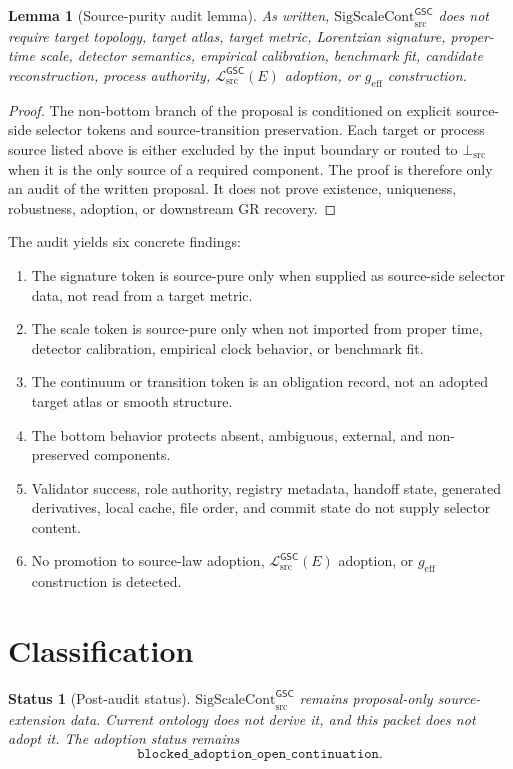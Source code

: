 \documentclass[11pt]{article}
\newcommand{\MetricData}{\mathcal{L}_{\mathrm{src}}^{\mathsf{GSC}}}
\newcommand{\geff}{g_{\mathrm{eff}}}
\newcommand{\SigScaleCont}{\mathrm{SigScaleCont}_{\mathrm{src}}^{\mathsf{GSC}}}
\newcommand{\BottomSrc}{\bot_{\mathrm{src}}}
\newtheorem{lemma}{Lemma}
\newtheorem{status}{Status}
\begin{document}
\begin{lemma}[Source-purity audit lemma]
As written, \(\SigScaleCont\) does not require target topology, target atlas,
target metric, Lorentzian signature, proper-time scale, detector semantics,
empirical calibration, benchmark fit, candidate reconstruction, process
authority, \(\MetricData(E)\) adoption, or \(\geff\) construction.
\end{lemma}

\begin{proof}
The non-bottom branch of the proposal is conditioned on explicit source-side
selector tokens and source-transition preservation. Each target or process
source listed above is either excluded by the input boundary or routed to
\(\BottomSrc\) when it is the only source of a required component. The proof is
therefore only an audit of the written proposal. It does not prove existence,
uniqueness, robustness, adoption, or downstream GR recovery.
\end{proof}

The audit yields six concrete findings:
\begin{enumerate}[leftmargin=*]
  \item The signature token is source-pure only when supplied as source-side
  selector data, not read from a target metric.
  \item The scale token is source-pure only when not imported from proper
  time, detector calibration, empirical clock behavior, or benchmark fit.
  \item The continuum or transition token is an obligation record, not an
  adopted target atlas or smooth structure.
  \item The bottom behavior protects absent, ambiguous, external, and
  non-preserved components.
  \item Validator success, role authority, registry metadata, handoff state,
  generated derivatives, local cache, file order, and commit state do not
  supply selector content.
  \item No promotion to source-law adoption, \(\MetricData(E)\) adoption, or
  \(\geff\) construction is detected.
\end{enumerate}

\section{Classification}

\begin{status}[Post-audit status]
\(\SigScaleCont\) remains proposal-only source-extension data. Current
ontology does not derive it, and this packet does not adopt it. The adoption
status remains
\[
  \texttt{blocked\_adoption\_open\_continuation}.
\]
\end{status}
\end{document}
